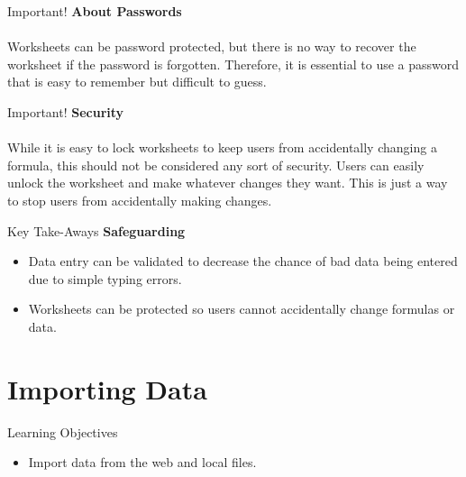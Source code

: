 \begin{center}
	\begin{infobox}{Important!}
		\textbf{About Passwords}
		\\
		\\
		Worksheets can be password protected, but there is no way to recover the worksheet if the password is forgotten. Therefore, it is essential to use a password that is easy to remember but difficult to guess.
	\end{infobox}
\end{center}

\begin{center}
	\begin{infobox}{Important!}
		\textbf{Security}
		\\
		\\
		While it is easy to lock worksheets to keep users from accidentally changing a formula, this should not be considered any sort of security. Users can easily unlock the worksheet and make whatever changes they want. This is just a way to stop users from accidentally making changes.
	\end{infobox}
\end{center}

\begin{center}
	\begin{tkwbox}{Key Take-Aways}
		\textbf{Safeguarding}
		\\
		\begin{itemize}
			\setlength{\itemsep}{0pt}
			\setlength{\parskip}{0pt}
			\setlength{\parsep}{0pt}
			
			\item Data entry can be validated to decrease the chance of bad data being entered due to simple typing errors.
			\item Worksheets can be protected so users cannot accidentally change formulas or data.
			
		\end{itemize}
	\end{tkwbox}
\end{center}

\section{Importing Data}

\begin{center}
	\begin{objbox}{Learning Objectives}
		\begin{itemize}
			\setlength{\itemsep}{0pt}
			\setlength{\parskip}{0pt}
			\setlength{\parsep}{0pt}
			
			\item Import data from the web and local files.

		\end{itemize}
	\end{objbox}
\end{center}

